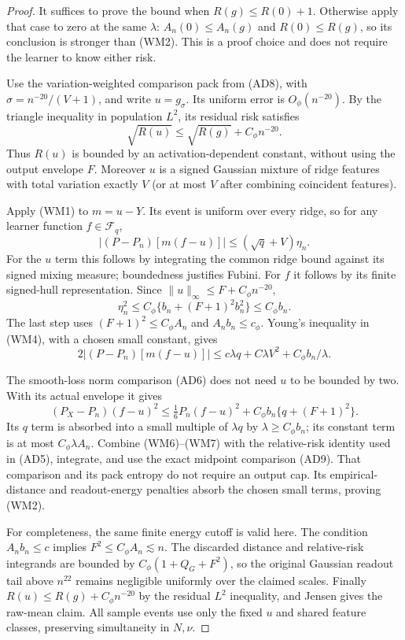 \begin{proof}
It suffices to prove the bound when $R(g)\le R(0)+1$. Otherwise
apply that case to zero at the same $\lambda$: $A_n(0)\le A_n(g)$
and $R(0)\le R(g)$, so its conclusion is stronger than (WM2).
This is a proof choice and does not require the learner to know either risk.

Use the variation-weighted comparison pack from (AD8), with
$\sigma=n^{-20}/(V+1)$, and write $u=g_\sigma$.
Its uniform error is $O_\phi(n^{-20})$. By the triangle inequality in
population $L^2$, its residual risk satisfies
\[
 \sqrt{R(u)}\le\sqrt{R(g)}+C_\phi n^{-20}.
\]
Thus $R(u)$ is bounded by an activation-dependent constant,
without using the output envelope $F$. Moreover $u$ is a signed
Gaussian mixture of ridge features with total variation exactly $V$
(or at most $V$ after combining coincident features).

Apply (WM1) to $m=u-Y$. Its event is uniform over every ridge, so for
any learner function $f\in\mathcal F_q$,
\[
 |(P-P_n)[m(f-u)]|\le(\sqrt q+V)\eta_n.                 \tag{WM4}
\]
For the $u$ term this follows by integrating the common ridge bound
against its signed mixing measure; boundedness justifies Fubini.
For $f$ it follows by its finite signed-hull representation.
Since $\|u\|_\infty\le F+C_\phi n^{-20}$,
\[
 \eta_n^2\le C_\phi\{b_n+(F+1)^2b_n^2\}
 \le C_\phi b_n.                                      \tag{WM5}
\]
The last step uses $(F+1)^2\le C_\phi A_n$ and $A_nb_n\le c_\phi$.
Young's inequality in (WM4), with a chosen small constant, gives
\[
 2|(P-P_n)[m(f-u)]|
 \le c\lambda q+C\lambda V^2+C_\phi b_n/\lambda.        \tag{WM6}
\]

The smooth-loss norm comparison (AD6) does not need $u$ to be bounded
by two. With its actual envelope it gives
\[
 (P_X-P_n)(f-u)^2
 \le\tfrac16P_n(f-u)^2
       +C_\phi b_n\{q+(F+1)^2\}.                      \tag{WM7}
\]
Its $q$ term is absorbed into a small multiple of $\lambda q$ by
$\lambda\ge C_\phi b_n$; its constant term is at most
$C_\phi\lambda A_n$. Combine (WM6)--(WM7) with the relative-risk
identity used in (AD5), integrate, and use the exact midpoint
comparison (AD9). That comparison and its pack entropy do not require
an output cap. Its empirical-distance and readout-energy penalties
absorb the chosen small terms, proving (WM2).

For completeness, the same finite energy cutoff is valid here.
The condition $A_nb_n\le c$ implies $F^2\le C_\phi A_n\lesssim n$.
The discarded distance and relative-risk integrands are bounded by
$C_\phi(1+Q_G+F^2)$, so the original Gaussian readout tail above
$n^{22}$ remains negligible uniformly over the claimed scales.
Finally $R(u)\le R(g)+C_\phi n^{-20}$ by the residual $L^2$ inequality,
and Jensen gives the raw-mean claim. All sample events use only the
fixed $u$ and shared feature classes, preserving simultaneity in $N,\nu$.
\end{proof}

